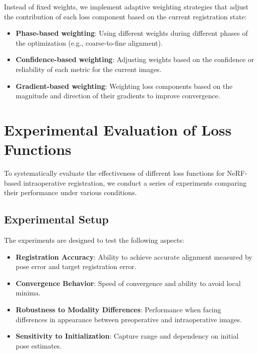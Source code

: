 Instead of fixed weights, we implement adaptive weighting strategies that adjust the contribution of each loss component based on the current registration state:

\begin{itemize}
    \item \textbf{Phase-based weighting}: Using different weights during different phases of the optimization (e.g., coarse-to-fine alignment).
    
    \item \textbf{Confidence-based weighting}: Adjusting weights based on the confidence or reliability of each metric for the current images.
    
    \item \textbf{Gradient-based weighting}: Weighting loss components based on the magnitude and direction of their gradients to improve convergence.
\end{itemize}

\section{Experimental Evaluation of Loss Functions}

To systematically evaluate the effectiveness of different loss functions for NeRF-based intraoperative registration, we conduct a series of experiments comparing their performance under various conditions.

\subsection{Experimental Setup}

The experiments are designed to test the following aspects:

\begin{itemize}
    \item \textbf{Registration Accuracy}: Ability to achieve accurate alignment measured by pose error and target registration error.
    
    \item \textbf{Convergence Behavior}: Speed of convergence and ability to avoid local minima.
    
    \item \textbf{Robustness to Modality Differences}: Performance when facing differences in appearance between preoperative and intraoperative images.
    
    \item \textbf{Sensitivity to Initialization}: Capture range and dependency on initial pose estimates.
\end{itemize}

